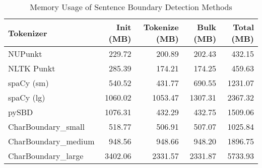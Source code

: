 \begin{table*}[htbp!]
\centering
\caption{Memory Usage of Sentence Boundary Detection Methods}
\label{tab:memory-usage}
\begin{tabular}{lrrrr}
\toprule
\textbf{Tokenizer} & \textbf{Init (MB)} & \textbf{Tokenize (MB)} & \textbf{Bulk (MB)} & \textbf{Total (MB)} \\
\midrule
NUPunkt & 229.72 & 200.89 & 202.43 & 432.15 \\
NLTK Punkt & 285.39 & 174.21 & 174.25 & 459.63 \\
spaCy (sm) & 540.52 & 431.77 & 690.55 & 1231.07 \\
spaCy (lg) & 1060.02 & 1053.47 & 1307.31 & 2367.32 \\
pySBD & 1076.31 & 432.29 & 432.75 & 1509.06 \\
CharBoundary\_small & 518.77 & 506.91 & 507.07 & 1025.84 \\
CharBoundary\_medium & 948.56 & 948.66 & 948.20 & 1896.75 \\
CharBoundary\_large & 3402.06 & 2331.57 & 2331.87 & 5733.93 \\
\bottomrule
\end{tabular}
\end{table*}

